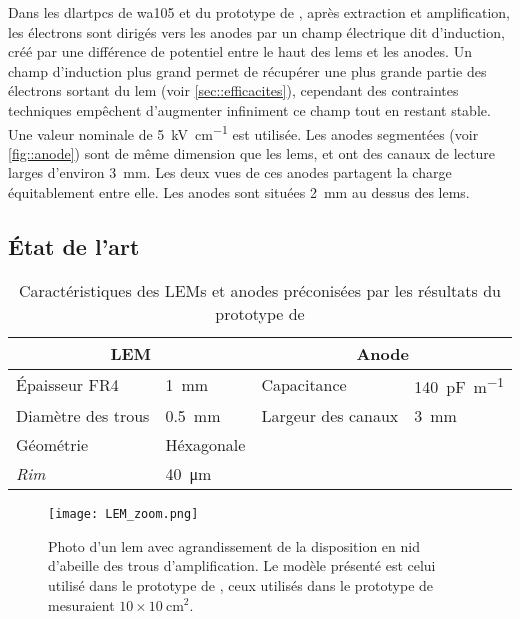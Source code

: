       Dans les \glspl{dlartpc} de \gls{wa105} et du prototype de \threeL{}, après extraction et amplification, les électrons sont dirigés vers les anodes par un champ électrique dit d'induction, créé par une différence de potentiel entre le haut des \glspl{lem} et les anodes. Un champ d'induction plus grand permet de récupérer une plus grande partie des électrons sortant du \gls{lem} (voir \autoref{sec::efficacites}), cependant des contraintes techniques empêchent d'augmenter infiniment ce champ tout en restant stable. Une valeur nominale de \SI{5}{\kilo\volt\per\centi\meter} est utilisée. Les anodes segmentées (voir \autoref{fig::anode}) sont de même dimension que les \glspl{lem}, et ont des canaux de lecture larges d'environ \SI{3}{\milli\meter}. Les deux vues de ces anodes partagent la charge équitablement entre elle. Les anodes sont situées \SI{2}{\milli\meter} au dessus des \glspl{lem}.

    \subsection{État de l'art}\label{sec::state_of_the_art}

      \begin{table}[]
        \centering
        \begin{tabular}{|ll||ll|}
          \hline
          \multicolumn{2}{|c||}{LEM} & \multicolumn{2}{c|}{Anode} \\ \hline \hline
          Épaisseur FR4 & \SI{1}{\milli\meter} & Capacitance & \SI{140}{\pico\farad\per\meter} \\
          Diamètre des trous & \SI{0.5}{\milli\meter} & Largeur des canaux & \SI{3}{\milli\meter} \\
          Géométrie & Héxagonale &  &  \\
          \textit{Rim} & \SI{40}{\micro\meter} &  &  \\ \hline
        \end{tabular}
        \caption[Caractéristiques des LEMs et anodes utilisé dans le \threeL{}]{\label{tab::lem_anode}Caractéristiques des LEMs et anodes préconisées par les résultats du prototype de \threeL{}}
      \end{table}

      \begin{figure}[!htb]
        \centering
        \texttt{[image: LEM\_zoom.png]} 
        \caption[Photo d'un amplificateur d'électron]{Photo d'un \gls{lem} avec agrandissement de la disposition en nid d'abeille des trous d'amplification. Le modèle présenté est celui utilisé dans le prototype de \TOO{}, ceux utilisés dans le prototype de \threeL{} mesuraient $10\times\SI{10}{\centi\meter\squared}$.}
        \label{fig::lem}
      \end{figure}

